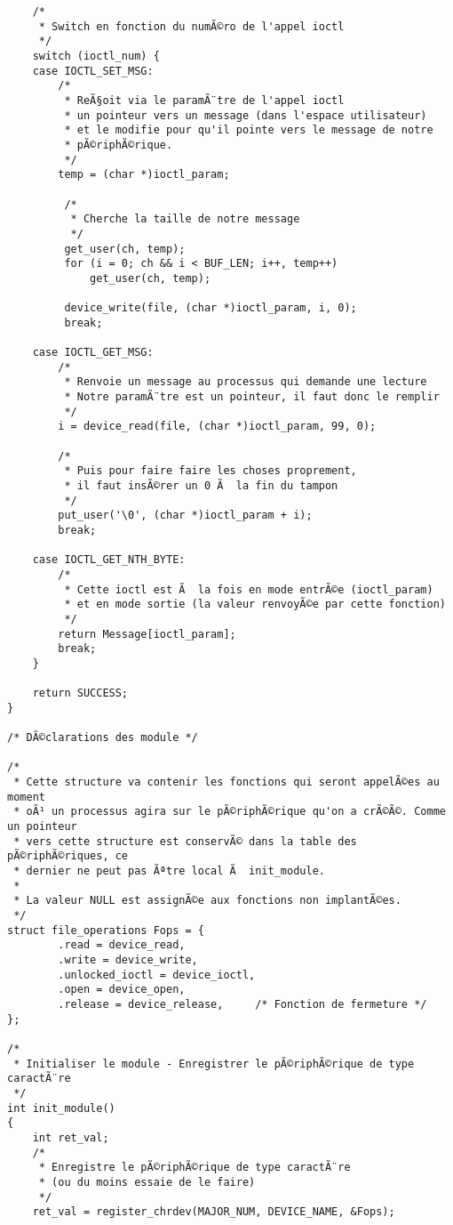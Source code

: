 \documentclass[11pt]{article}
\begin{document}
\begin{verbatim}
    /*
     * Switch en fonction du numÃ©ro de l'appel ioctl
     */
    switch (ioctl_num) {
    case IOCTL_SET_MSG:
        /*
         * ReÃ§oit via le paramÃ¨tre de l'appel ioctl
         * un pointeur vers un message (dans l'espace utilisateur)
         * et le modifie pour qu'il pointe vers le message de notre
         * pÃ©riphÃ©rique.
         */
        temp = (char *)ioctl_param;

         /*
          * Cherche la taille de notre message
          */
         get_user(ch, temp);
         for (i = 0; ch && i < BUF_LEN; i++, temp++)
             get_user(ch, temp);

         device_write(file, (char *)ioctl_param, i, 0);
         break;

    case IOCTL_GET_MSG:
        /*
         * Renvoie un message au processus qui demande une lecture
         * Notre paramÃ¨tre est un pointeur, il faut donc le remplir
         */
        i = device_read(file, (char *)ioctl_param, 99, 0);

        /*
         * Puis pour faire faire les choses proprement,
         * il faut insÃ©rer un 0 Ã  la fin du tampon
         */
        put_user('\0', (char *)ioctl_param + i);
        break;

    case IOCTL_GET_NTH_BYTE:
        /*
         * Cette ioctl est Ã  la fois en mode entrÃ©e (ioctl_param)
         * et en mode sortie (la valeur renvoyÃ©e par cette fonction)
         */
        return Message[ioctl_param];
        break;
    }

    return SUCCESS;
}

/* DÃ©clarations des module */

/*
 * Cette structure va contenir les fonctions qui seront appelÃ©es au moment
 * oÃ¹ un processus agira sur le pÃ©riphÃ©rique qu'on a crÃ©Ã©. Comme un pointeur
 * vers cette structure est conservÃ© dans la table des pÃ©riphÃ©riques, ce
 * dernier ne peut pas Ãªtre local Ã  init_module.
 *
 * La valeur NULL est assignÃ©e aux fonctions non implantÃ©es.
 */
struct file_operations Fops = {
        .read = device_read,
        .write = device_write,
        .unlocked_ioctl = device_ioctl,
        .open = device_open,
        .release = device_release,     /* Fonction de fermeture */
};

/*
 * Initialiser le module - Enregistrer le pÃ©riphÃ©rique de type caractÃ¨re
 */
int init_module()
{
    int ret_val;
    /*
     * Enregistre le pÃ©riphÃ©rique de type caractÃ¨re
     * (ou du moins essaie de le faire)
     */
    ret_val = register_chrdev(MAJOR_NUM, DEVICE_NAME, &Fops);


\end{verbatim}
\end{document}
